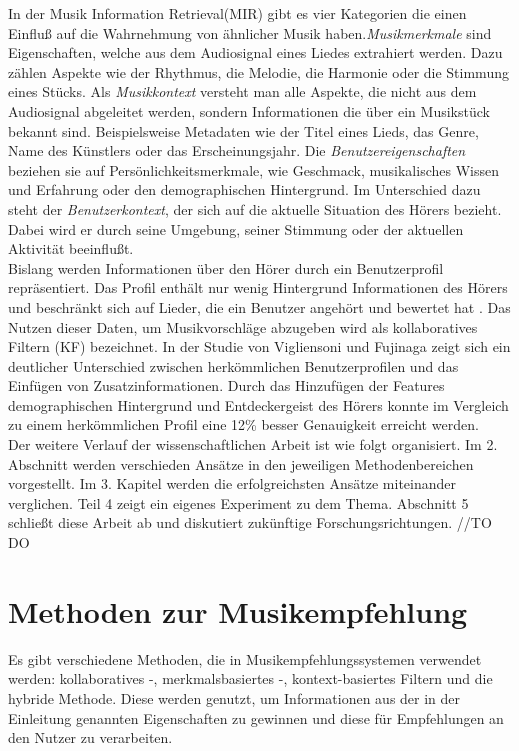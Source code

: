 \documentclass[twosided,a4,10pt]{article}
\begin{document}
\begin{multicols}{2}
		In der Musik Information Retrieval(MIR) gibt es vier Kategorien \cite{schedl} die einen Einfluß auf die Wahrnehmung von ähnlicher Musik haben.\newline \textit{Musikmerkmale} sind Eigenschaften, welche aus dem Audiosignal eines Liedes extrahiert werden. Dazu zählen Aspekte wie der Rhythmus, die Melodie, die Harmonie oder die Stimmung eines Stücks.\newline
		Als \textit{Musikkontext} versteht man alle Aspekte, die nicht aus dem Audiosignal abgeleitet werden, sondern Informationen die über ein Musikstück bekannt sind. Beispielsweise Metadaten wie der Titel eines Lieds, das Genre, Name des Künstlers oder das Erscheinungsjahr.\newline
		Die \textit{Benutzereigenschaften} beziehen sie auf Persönlichkeitsmerkmale, wie Geschmack, musikalisches Wissen und Erfahrung oder den demographischen Hintergrund.\newline
		Im Unterschied dazu steht der \textit{Benutzerkontext}, der sich auf die aktuelle Situation des Hörers bezieht. Dabei wird er durch seine Umgebung, seiner Stimmung oder der aktuellen Aktivität beeinflußt. \cite{knees}\newline\\
		Bislang werden Informationen über den Hörer durch ein Benutzerprofil repräsentiert. Das Profil enthält nur wenig Hintergrund Informationen des Hörers und beschränkt sich auf Lieder, die ein Benutzer angehört und bewertet hat \cite{oord}. Das Nutzen dieser Daten, um Musikvorschläge abzugeben wird als kollaboratives Filtern (KF) bezeichnet. In der Studie von Vigliensoni und Fujinaga \cite{vigliensoni} zeigt sich ein deutlicher Unterschied zwischen herkömmlichen Benutzerprofilen und das Einfügen von Zusatzinformationen. Durch das Hinzufügen der Features demographischen Hintergrund und Entdeckergeist des Hörers konnte im Vergleich zu einem herkömmlichen Profil eine 12\% besser Genauigkeit erreicht werden.\newline\\
		Der weitere Verlauf der wissenschaftlichen Arbeit ist wie folgt organisiert. Im 2. Abschnitt werden verschieden Ansätze in den jeweiligen Methodenbereichen vorgestellt. Im 3. Kapitel werden die erfolgreichsten Ansätze miteinander verglichen. Teil 4 zeigt ein eigenes Experiment zu dem Thema. Abschnitt 5 schließt diese Arbeit ab und diskutiert zukünftige Forschungsrichtungen. //TO DO
		
		\section{Methoden zur Musikempfehlung}
		Es gibt verschiedene Methoden, die in Musikempfehlungssystemen verwendet werden: kollaboratives -, merkmalsbasiertes -, kontext-basiertes Filtern und die hybride Methode. Diese werden genutzt, um Informationen aus der in der Einleitung genannten Eigenschaften zu gewinnen und diese für Empfehlungen an den Nutzer zu verarbeiten. \cite{kaitila}
	

\end{multicols}
\end{document}
